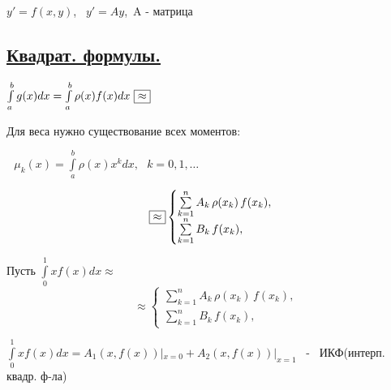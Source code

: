 \documentclass[12pt]{article}
\begin{document}
$y' = f(x,y)$, \ $y' = Ay$,\ A - матрица


\begin{center}
\section*{\underline{Квадрат. формулы.}}
\end{center}

$\int\limits_a^b g(x)dx = \int\limits_a^b \rho(x)f(x)dx \ \fbox{$\approx$}$



Для веса нужно существование всех моментов:

$\ \ \ \mu_k(x) = \int\limits_a^b \rho(x)x^kdx, \ \ \ k = 0, 1,\ldots$


\begin{equation*}
\quad \fbox{$\approx$}
 \begin{cases}
   \sum\limits_{k=1}^n A_k \, \rho(x_k) \, f(x_k),
   \\
   \sum\limits_{k=1}^n B_k \, f(x_k),
 \end{cases}
\end{equation*}


Пусть $\int\limits_0^1 xf(x)dx \approx$
\begin{equation*}
\quad \approx
 \begin{cases}
   \sum\limits_{k=1}^n A_k \, \rho(x_k) \, f(x_k),
   \\
   \sum\limits_{k=1}^n B_k \, f(x_k),
 \end{cases}
\end{equation*}

$\int\limits_0^1 xf(x)dx = A_1(x, f(x))|_{x=0} +  A_2(x, f(x))|_{x=1}$ \ - \ ИКФ(интерп. квадр. ф-ла)
\end{document}
